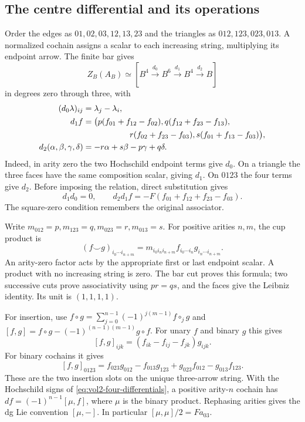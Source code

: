 \subsection{The centre differential and its operations}

Order the edges as $01,02,03,12,13,23$ and the triangles as
$012,123,023,013$. A normalized cochain assigns a scalar to
each increasing string, multiplying its endpoint arrow.
The finite bar gives
\begin{equation}\label{eq:vol2-four-centre}
 Z_B(A_B)\simeq
 [B^4\xrightarrow{d_0}B^6\xrightarrow{d_1}B^4\xrightarrow{d_2}B]
\end{equation}
in degrees zero through three, with
\begin{align}\label{eq:vol2-four-differentials}
 (d_0\lambda)_{ij}&=\lambda_j-\lambda_i,\notag\\
 d_1f&=\bigl(p(f_{01}+f_{12}-f_{02}),
             q(f_{12}+f_{23}-f_{13}),\notag\\
 &\hspace{20mm}r(f_{02}+f_{23}-f_{03}),
             s(f_{01}+f_{13}-f_{03})\bigr),\notag\\
 d_2(\alpha,\beta,\gamma,\delta)&=-r\alpha+s\beta-p\gamma+q\delta.
\end{align}
Indeed, in arity zero the two Hochschild endpoint terms give
$d_0$. On a triangle the three faces have the same composition
scalar, giving $d_1$. On $0123$ the four terms give $d_2$.
Before imposing the relation, direct substitution gives
\begin{equation}\label{eq:vol2-four-square}
 d_1d_0=0,\qquad
 d_2d_1f=-F(f_{01}+f_{12}+f_{23}-f_{03}).
\end{equation}
The square-zero condition remembers the original associator.

Write $m_{012}=p,m_{123}=q,m_{023}=r,m_{013}=s$.
For positive arities $n,m$, the cup product is
\begin{equation}\label{eq:vol2-four-cup}
 (f\smile g)_{i_0\cdots i_{n+m}}
   =m_{i_0i_ni_{n+m}}f_{i_0\cdots i_n}g_{i_n\cdots i_{n+m}}.
\end{equation}
An arity-zero factor acts by the appropriate first or last
endpoint scalar. A product with no increasing string is zero.
The bar cut proves this formula; two successive cuts prove
associativity using $pr=qs$, and the faces give the Leibniz
identity. Its unit is $(1,1,1,1)$.

For insertion, use
$f\circ g=\sum_{j=0}^{n-1}(-1)^{j(m-1)}f\circ_jg$ and
$[f,g]=f\circ g-(-1)^{(n-1)(m-1)}g\circ f$.
For unary $f$ and binary $g$ this gives
\[
 [f,g]_{ijk}=(f_{ik}-f_{ij}-f_{jk})g_{ijk}.
\]
For binary cochains it gives
\begin{equation}\label{eq:vol2-four-bracket}
 [f,g]_{0123}=f_{023}g_{012}-f_{013}g_{123}
                   +g_{023}f_{012}-g_{013}f_{123}.
\end{equation}
These are the two insertion slots on the unique three-arrow
string. With the Hochschild signs of
\eqref{eq:vol2-four-differentials}, a positive arity-$n$
cochain has $df=(-1)^{n-1}[\mu,f]$, where $\mu$ is the binary
product. Rephasing arities gives the dg Lie convention
$[\mu,-]$. In particular $[\mu,\mu]/2=Fa_{03}$.

